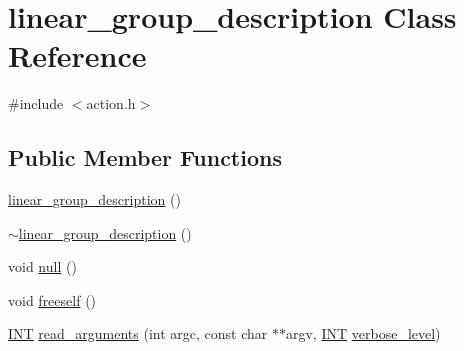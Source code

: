 \hypertarget{classlinear__group__description}{}\section{linear\+\_\+group\+\_\+description Class Reference}
\label{classlinear__group__description}


{\ttfamily \#include $<$action.\+h$>$}

\subsection*{Public Member Functions}
\begin{DoxyCompactItemize}
\item 
\mbox{\hyperlink{classlinear__group__description_a430ec5360d9d73795a78b754d649bf17}{linear\+\_\+group\+\_\+description}} ()
\item 
\mbox{\hyperlink{classlinear__group__description_aabf4f990e803e2db35485b2c2212319f}{$\sim$linear\+\_\+group\+\_\+description}} ()
\item 
void \mbox{\hyperlink{classlinear__group__description_a31fa0c221d785baa3c1880ec3d067acc}{null}} ()
\item 
void \mbox{\hyperlink{classlinear__group__description_af5a923253aad039c8cb00e2b9cab6906}{freeself}} ()
\item 
\mbox{\hyperlink{galois_8h_a09fddde158a3a20bd2dcadb609de11dc}{I\+NT}} \mbox{\hyperlink{classlinear__group__description_a1c27f3e72fca881743cd1ca35f6779f0}{read\+\_\+arguments}} (int argc, const char $\ast$$\ast$argv, \mbox{\hyperlink{galois_8h_a09fddde158a3a20bd2dcadb609de11dc}{I\+NT}} \mbox{\hyperlink{simeon_8_c_a818073fbcc2f439e7c56952f67386122}{verbose\+\_\+level}})
\end{DoxyCompactItemize}
